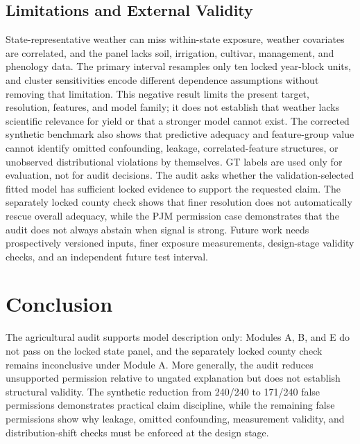 \documentclass[conference]{IEEEtran}
\begin{document}
\subsection{Limitations and External Validity}
State-representative weather can miss within-state exposure, weather covariates
are correlated, and the panel lacks soil, irrigation, cultivar, management, and
phenology data. The primary interval resamples only ten locked year-block units, and
cluster sensitivities encode different dependence assumptions without removing
that limitation. This negative result limits the present target, resolution,
features, and model family; it does not establish that weather lacks scientific
relevance for yield or that a stronger model cannot exist. The corrected synthetic
benchmark also shows that predictive adequacy and feature-group value cannot
identify omitted confounding, leakage, correlated-feature structures, or unobserved
distributional violations by themselves. GT labels are used only for evaluation,
not for audit decisions. The audit asks whether the validation-selected fitted
model has sufficient locked evidence to support the requested claim. The separately
locked county check shows that finer resolution does not automatically rescue
overall adequacy, while the PJM permission case demonstrates that the audit does
not always abstain when signal is strong.
Future work needs prospectively versioned inputs, finer exposure measurements,
design-stage validity checks, and an independent future test interval.

\section{Conclusion}
The agricultural audit supports model description only: Modules A, B, and E do not pass
on the locked state panel, and the separately locked county check remains
inconclusive under Module A. More generally, the audit reduces unsupported
permission relative to ungated explanation but does not establish structural
validity. The synthetic reduction from 240/240 to 171/240 false permissions
demonstrates practical claim discipline, while the remaining false permissions show why
leakage, omitted confounding, measurement validity, and distribution-shift checks
must be enforced at the design stage.



\end{document}
